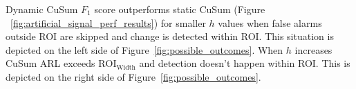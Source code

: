Dynamic CuSum $F_1$ score outperforms static CuSum (Figure ~\ref{fig:artificial_signal_perf_results}) for smaller $h$ values when false alarms outside ROI are skipped and change is detected within ROI. 
This situation is depicted on the left side of Figure~\ref{fig:possible_outcomes}.
When $h$ increases CuSum ARL exceeds $\text{ROI}_{\text{Width}}$ and detection doesn't happen within ROI.
This is depicted on the right side of Figure~\ref{fig:possible_outcomes}. 
